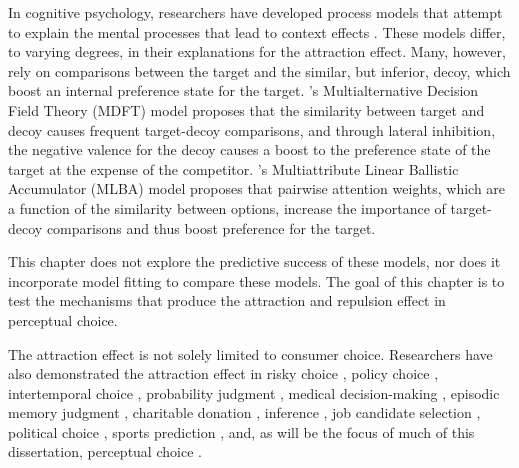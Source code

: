 In cognitive psychology, researchers have developed process models that attempt to explain the mental processes that lead to context effects \parencite{trueblood2014multiattribute,roeMultialternativeDecisionField2001a,busemeyerCognitiveNeuralBases2019, usherLossAversionInhibition2004a,bhatiaAssociationsAccumulationPreference2013b,noguchiMultialternativeDecisionSampling2018a,wollschlager2NaryChoiceTree2012a,bergnerVAMPVotingAgent2019b,tverskyEliminationAspectsTheory1972,tversky1993context}. These models differ, to varying degrees, in their explanations for the attraction effect. Many, however, rely on comparisons between the target and the similar, but inferior, decoy, which boost an internal  preference state for the target. \textcite{roeMultialternativeDecisionField2001a}'s Multialternative Decision Field Theory (MDFT) model proposes that the similarity between target and decoy causes frequent target-decoy comparisons, and through lateral inhibition, the negative valence for the decoy causes a boost to the preference state of the target at the expense of the competitor. \textcite{trueblood2014multiattribute}'s Multiattribute Linear Ballistic Accumulator (MLBA) model proposes that pairwise attention weights, which are a function of the similarity between options, increase the importance of target-decoy comparisons and thus boost preference for the target. 

This chapter does not explore the predictive success of these models, nor does it incorporate model fitting to compare these models. The goal of this chapter is to test the mechanisms that produce the attraction and repulsion effect in perceptual choice.


The attraction effect is not solely limited to consumer choice. Researchers have also demonstrated the attraction effect in risky choice \parencite{mohr2017attraction}, policy choice \parencite{herneDecoyAlternativesPolicy1997b}, intertemporal choice \parencite{mariniAttractionComesMany2020}, probability judgment \parencite{caiWhenAlternativeHypotheses2023}, medical decision-making \parencite{schwartz1999more}, episodic memory judgment \parencite{maylorSimilarityAttractionEffects2007b}, charitable donation \parencite{pittarello2020three},  inference \parencite{truebloodMultialternativeContextEffects2012}, job candidate selection \parencite{highhouseContextDependentSelectionEffects1996}, political choice \parencite{pan1995attractiovoting}, sports prediction \parencite{fang2024context}, and, as will be the focus of much of this dissertation, perceptual choice \parencite{evansImpactPresentationOrder2021,trueblood2013not, trueblood2015fragile, spektorRepulsionEffectPreferential2022,spektorWhenGoodLooks2018b,yearsleyContextEffectsSimilarity2022,turnerCompetingTheoriesMultialternative2018a,liaoInfluenceDistanceDecoy2021}. 


